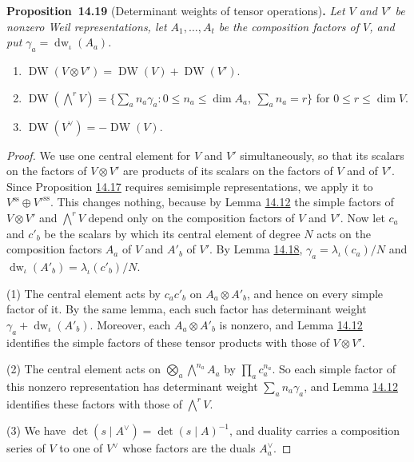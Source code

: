 \documentclass[11pt]{article}
\newenvironment{bpstatement}[2]{\par\addvspace{0.6\baselineskip}\noindent\textbf{#1}#2\textbf{.}\enspace\ignorespaces}
  {\par\addvspace{0.4\baselineskip}}
\newenvironment{bpstatementit}[2]{\begin{bpstatement}{#1}{#2}\itshape\ignorespaces}{\end{bpstatement}}
\begin{document}
\label{bp61}%
\begin{bpstatementit}{Proposition~14.19}{ (Determinant weights of tensor operations)}
Let \(V\) and \(V'\) be nonzero Weil representations, let \(A_1,\ldots,A_t\) be the composition factors of \(V\), and put \(\gamma_a=\operatorname{dw}_\iota(A_a)\).

\begin{enumerate}
\item \(\operatorname{DW}(V\otimes V')=\operatorname{DW}(V)+\operatorname{DW}(V')\).
\item \(\operatorname{DW}(\bigwedge^rV)=\bigl\{\sum_an_a\gamma_a :
      0\le n_a\le\dim A_a,\ \sum_an_a=r\bigr\}\) for \(0\le r\le\dim V\).
\item \(\operatorname{DW}(V^\vee)=-\operatorname{DW}(V)\).
\end{enumerate}
\end{bpstatementit}

\begin{proof}[{Proof}]\label{bp62}%
We use one central element for \(V\) and \(V'\) simultaneously, so that its scalars on the factors of \(V\otimes V'\) are products of its scalars on the factors of \(V\) and of \(V'\). Since Proposition \hyperref[bp54]{14.17} requires semisimple representations, we apply it to \(V^{\mathrm{ss}}\oplus V'^{\mathrm{ss}}\). This changes nothing, because by Lemma \hyperref[bp40]{14.12} the simple factors of \(V\otimes V'\) and \(\bigwedge^rV\) depend only on the composition factors of \(V\) and \(V'\). Now let \(c_a\) and \(c'_b\) be the scalars by which its central element of degree \(N\) acts on the composition factors \(A_a\) of \(V\) and \(A'_b\) of \(V'\). By Lemma \hyperref[bp58]{14.18}, \(\gamma_a=\lambda_\iota(c_a)/N\) and \(\operatorname{dw}_\iota(A'_b)=\lambda_\iota(c'_b)/N\).

(1) The central element acts by \(c_ac'_b\) on \(A_a\otimes A'_b\), and hence on every simple factor of it. By the same lemma, each such factor has determinant weight \(\gamma_a+\operatorname{dw}_\iota(A'_b)\). Moreover, each \(A_a\otimes A'_b\) is nonzero, and Lemma \hyperref[bp40]{14.12} identifies the simple factors of these tensor products with those of \(V\otimes V'\).

(2) The central element acts on \(\bigotimes_a\bigwedge^{n_a}A_a\) by \(\prod_ac_a^{n_a}\). So each simple factor of this nonzero representation has determinant weight \(\sum_an_a\gamma_a\), and Lemma \hyperref[bp40]{14.12} identifies these factors with those of \(\bigwedge^rV\).

(3) We have \(\det(s\mid A^\vee)=\det(s\mid A)^{-1}\), and duality carries a composition series of \(V\) to one of \(V^\vee\) whose factors are the duals \(A_a^\vee\).
\end{proof}
\end{document}
